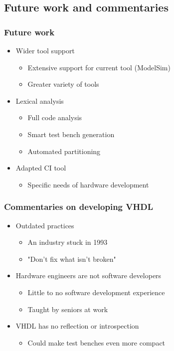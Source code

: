 \documentclass[british,10pt]{beamer}
\begin{document}

\subsection{Future work and commentaries}

\begin{frame}\frametitle{Future work}
\begin{itemize}
\item Wider tool support
\begin{itemize}
\item Extensive support for current tool (ModelSim)
\item Greater variety of tools 
\end{itemize}
\item Lexical analysis
\begin{itemize}
\item Full code analysis
\item Smart test bench generation
\item Automated partitioning
\end{itemize}
\item Adapted CI tool
\begin{itemize}
\item Specific needs of hardware development
\end{itemize}
\end{itemize}
\end{frame}


\begin{frame}\frametitle{Commentaries on developing VHDL}
\begin{itemize}
\item Outdated practices
\begin{itemize}
\item An industry stuck in 1993
\item "Don't fix what isn't broken"
\end{itemize}
\item Hardware engineers are not software developers
\begin{itemize}
\item Little to no software development experience
\item Taught by seniors at work
\end{itemize}
\item VHDL has no reflection or introspection
\begin{itemize}
\item Could make test benches even more compact
\end{itemize}
\end{itemize}
\end{frame}
\end{document}
